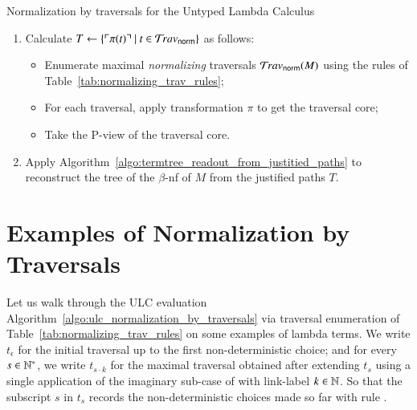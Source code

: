 \documentclass{elsarticle}
\theoremstyle{plain}
\theoremstyle{definition}
\theoremstyle{remark}
\newcommand{\normalizing}{{\sf norm}}
\newcommand{\travsetnorm}{\travset_\normalizing}
\def\coresymbol{\pi} %
\newcommand{\core}[1]{\coresymbol(#1)} %
\begin{document}
\begin{algorithm}%
\begin{algorithmic}
\caption{Normalization by traversals for the Untyped Lambda Calculus}
\label{algo:ulc_normalization_by_traversals}
\begin{enumerate}[nosep]
  \item Calculate $T \leftarrow \{ \pview{\core{t}} \ | \ t \in \travsetnorm \}$ as follows:
  \begin{itemize}[leftmargin=0.5em,nosep]
    \item Enumerate maximal \emph{normalizing} traversals $\travsetnorm(M)$ using the rules of Table~\ref{tab:normalizing_trav_rules};
    \item For each traversal, apply transformation $\coresymbol$ to get the traversal core;
    \item Take the P-view of the traversal core.
  \end{itemize}
  \item Apply Algorithm~\ref{algo:termtree_readout_from_justitied_paths} to reconstruct the tree of the $\beta$-nf of $M$ from the justified paths  $T$.
\end{enumerate}
\end{algorithmic}
\end{algorithm}

\section{Examples of Normalization by Traversals}
\label{sec:examples}
Let us walk through the ULC evaluation Algorithm~\ref{algo:ulc_normalization_by_traversals} via traversal enumeration of Table~\ref{tab:normalizing_trav_rules} on some examples of lambda terms. We write $t_\epsilon$  for the initial traversal up to the first non-deterministic choice; and for every $s \in \mathbb{N}^*$, we write $t_{s \cdot k}$ for the maximal traversal obtained after extending $t_s$ using a single application of the imaginary sub-case of  with link-label $k \in \mathbb{N}$. So that the subscript $s$ in $t_s$ records the non-deterministic choices made so far with rule .
\end{document}
